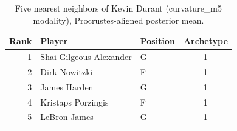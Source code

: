 \begin{table}[htbp]
  \centering\small
  \begin{tabular}{rllc}
    \toprule
    Rank & Player & Position & Archetype \\
    \midrule
    1 & Shai Gilgeous-Alexander & G & 1 \\
    2 & Dirk Nowitzki & F & 1 \\
    3 & James Harden & G & 1 \\
    4 & Kristaps Porzingis & F & 1 \\
    5 & LeBron James & G & 1 \\
    \bottomrule
  \end{tabular}
  \caption{Five nearest neighbors of Kevin Durant (curvature_m5 modality), Procrustes-aligned posterior mean.}
  \label{tab:Kevin_Durant_neighbors_curvature_m5}
\end{table}

